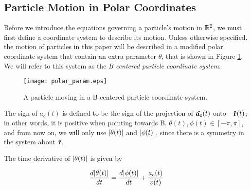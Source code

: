 \subsection{Particle Motion in Polar Coordinates}

Before we introduce the equations governing a particle's motion in $\mathbb R^2$, we must first define a coordinate system to describe its motion. Unless otherwise specified, the motion of particles in this paper will be described in a modified polar coordinate system that contain an extra parameter $\theta$, that is shown in Figure \ref{fig:polar-param}. We will refer to this system as the \textit{B centered particle coordinate system}.

\begin{figure}[H]
    \begin{center}
      \texttt{[image: polar\_param.eps]}
    \end{center}
  \vspace{-.2in} %
  \caption{A particle moving in a B centered particle coordinate system.\label{fig:polar-param}}
  \end{figure}

The sign of $a_c(t)$ is defined to be the sign of the projection of $\mathbf{\hat{a_c}}(t)$ onto $-\mathbf{\hat{r}}(t)$; in other words, it is positive when pointing towards B. $\theta(t), \phi(t) \in [-\pi, \pi]$, and from now on, we will only use $\abs{\theta(t)}$ and $\abs{\phi(t)}$, since there is a symmetry in the system about $\mathbf{\hat{r}}$. 

\begin{lemma}
The time derivative of $\abs{\theta(t)}$ is given by

\begin{equation}\label{eq:theta-deriv}
\frac{d\abs{\theta(t)}}{dt} = \frac{d\abs{\phi(t)}}{dt} + \frac{a_c(t)}{v(t)}
\end{equation}

\end{lemma}


